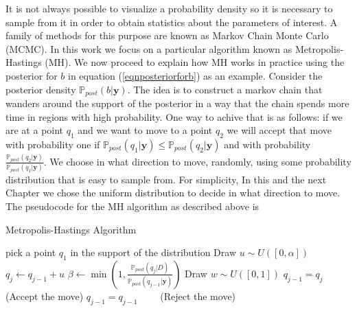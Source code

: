 \documentclass[12pt]{book}
\newcommand{\post}{\mathbb{P}_{post}}
\newcommand{\y}{\textbf{y}}
\begin{document}
It is not always possible to visualize a probability density so it is necessary to sample from it
in order to obtain statistics about the parameters of interest.
A family of methods for this purpose
are known as Markov Chain Monte Carlo (MCMC). In this work we 
focus on a particular algorithm known as Metropolis-Hastings  (MH). We now proceed  to explain
how MH works in practice using the posterior for $b$ in equation (\ref{eqnposteriorforb}) as an example. 
\newline
\newline
Consider the posterior density $\post(b|\y)$. The idea is to construct a markov chain that wanders 
around the support of the posterior
in a way that the chain spends more time in regions with high probability.
One way to achive that is as follows: if we are at a point $q_{1}$ and we want to move to a point $q_{2}$ 
we will accept 
that move with probability one if $\post(q_{1}|\y)\leq\post(q_{2}|\y)$ and with probability 
$\frac{\post(q_{2}|\y)}{\post(q_{1}|\y)}$.  We choose
in what direction to move, randomly, using some probability distribution that is easy to sample from.
For simplicity, In this and the next Chapter we chose the uniform distribution to decide in what  direction to move.
The pseudocode  for the MH algorithm as described above is \cite{Somersalo}

\begin{algorithm}
\caption{Metropolis-Hastings Algorithm}
\begin{algorithmic}[1]\label{algMH}
\State pick a point $q_{1}$ in the support of the distribution
\State Draw $u\sim U([0,\alpha])$
\State $q_{j}\leftarrow q_{j-1}+u$
\State $\beta\leftarrow\min(1,\frac{\post(q_{j}|D)}{\post(q_{j-1}|\y)})$
\State Draw $w\sim U([0,1])$
\State $q_{j-1}=q_{j}\qquad$   (Accept the move)
\Else
\State $q_{j-1}=q_{j-1}\qquad$ (Reject the move)
\EndIf
\EndFor
\end{algorithmic}
\end{algorithm}
\end{document}
